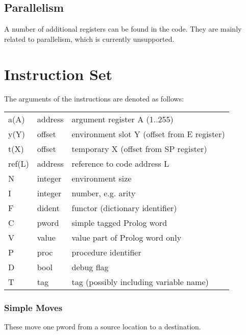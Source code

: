 \subsection{Parallelism}
A number of additional registers can be found in the code.
They are mainly related to parallelism, which is currently unsupported.


\section{Instruction Set}

The arguments of the instructions  are denoted as follows:

\begin{tabular}{|l|l|l|}
\hline
a(A)            & address & argument register A (1..255)\\
y(Y)            & offset & environment slot Y (offset from E register)\\
t(X)            & offset & temporary X (offset from SP register)\\
ref(L)          & address & reference to code address L\\
N               & integer & environment size\\
I               & integer & number, e.g. arity\\
F               & dident & functor (dictionary identifier)\\
C               & pword & simple tagged Prolog word\\
V               & value & value part of Prolog word only\\
P               & proc & procedure identifier\\
D               & bool & debug flag\\
T               & tag & tag (possibly including variable name) \\
\hline
\end{tabular}

\subsubsection{Simple Moves}
These move  one pword from a source location to a destination.

